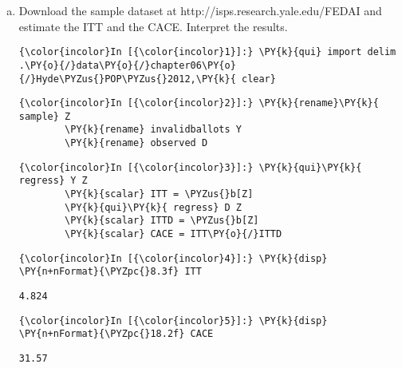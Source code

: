 \documentclass[11pt,notitlepage]{article}\usepackage[]{graphicx}\usepackage[]{color}
\makeatletter
\newenvironment{kframe}{%
 \def\at@end@of@kframe{}%
 \ifinner\ifhmode%
  \def\at@end@of@kframe{\end{minipage}}%
  \begin{minipage}{\columnwidth}%
 \fi\fi%
 \def\FrameCommand##1{\hskip\@totalleftmargin \hskip-\fboxsep
 \colorbox{shadecolor}{##1}\hskip-\fboxsep
     \hskip-\linewidth \hskip-\@totalleftmargin \hskip\columnwidth}%
 \MakeFramed {\advance\hsize-\width
   \@totalleftmargin\z@ \linewidth\hsize
   \@setminipage}}%
 {\par\unskip\endMakeFramed%
 \at@end@of@kframe}
\newenvironment{knitrout}{}{} %
\makeatother
\begin{document}
\begin{enumerate}[a)]
\item Download the sample dataset at http://isps.research.yale.edu/FEDAI and estimate the ITT and the CACE. Interpret the results.

\begin{knitrout}
\color{fgcolor}\begin{kframe}
   \begin{Verbatim}[commandchars=\\\{\}]
{\color{incolor}In [{\color{incolor}1}]:} \PY{k}{qui} import delim .\PY{o}{/}data\PY{o}{/}chapter06\PY{o}{/}Hyde\PYZus{}POP\PYZus{}2012,\PY{k}{ clear}
\end{Verbatim}

    \begin{Verbatim}[commandchars=\\\{\}]
{\color{incolor}In [{\color{incolor}2}]:} \PY{k}{rename}\PY{k}{ sample} Z
        \PY{k}{rename} invalidballots Y
        \PY{k}{rename} observed D
\end{Verbatim}

    \begin{Verbatim}[commandchars=\\\{\}]
{\color{incolor}In [{\color{incolor}3}]:} \PY{k}{qui}\PY{k}{ regress} Y Z
        \PY{k}{scalar} ITT = \PYZus{}b[Z]		
        \PY{k}{qui}\PY{k}{ regress} D Z
        \PY{k}{scalar} ITTD = \PYZus{}b[Z]		
        \PY{k}{scalar} CACE = ITT\PY{o}{/}ITTD
\end{Verbatim}

    \begin{Verbatim}[commandchars=\\\{\}]
{\color{incolor}In [{\color{incolor}4}]:} \PY{k}{disp} \PY{n+nFormat}{\PYZpc{}8.3f} ITT
\end{Verbatim}

    \begin{Verbatim}[commandchars=\\\{\}]
   4.824

    \end{Verbatim}

    \begin{Verbatim}[commandchars=\\\{\}]
{\color{incolor}In [{\color{incolor}5}]:} \PY{k}{disp} \PY{n+nFormat}{\PYZpc{}18.2f} CACE
\end{Verbatim}

    \begin{Verbatim}[commandchars=\\\{\}]
    31.57
    \end{Verbatim}
\end{kframe}
\end{knitrout}


\end{enumerate}
\end{document}
